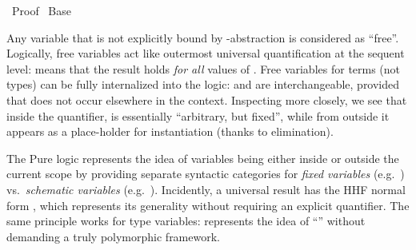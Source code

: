 %
\begin{isabellebody}%
\def\isabellecontext{Proof}%
%
\isadelimtheory
%
\endisadelimtheory
%
\isatagtheory
{}\isamarkupfalse%
\ Proof\isanewline
{}\ Base\isanewline
{}%
\endisatagtheory
{\isafoldtheory}%
%
\isadelimtheory
%
\endisadelimtheory
%
\isamarkuptrue%
%
\isamarkuptrue%
%
\begin{isamarkuptext}%
Any variable that is not explicitly bound by \isa{{\isasymlambda}}-abstraction
  is considered as ``free''.  Logically, free variables act like
  outermost universal quantification at the sequent level:  means that the result
  holds \emph{for all} values of .  Free variables for
  terms (not types) can be fully internalized into the logic:  and  are interchangeable, provided
  that  does not occur elsewhere in the context.
  Inspecting  more closely, we see that inside the
  quantifier,  is essentially ``arbitrary, but fixed'',
  while from outside it appears as a place-holder for instantiation
  (thanks to \isa{{\isasymAnd}} elimination).

  The Pure logic represents the idea of variables being either inside
  or outside the current scope by providing separate syntactic
  categories for \emph{fixed variables} (e.g.\ ) vs.\
  \emph{schematic variables} (e.g.\ ).  Incidently, a
  universal result  has the HHF normal form , which represents its generality without requiring an
  explicit quantifier.  The same principle works for type variables:
   represents the idea of ``''
  without demanding a truly polymorphic framework.


\end{isamarkuptext}
\end{isabellebody}
